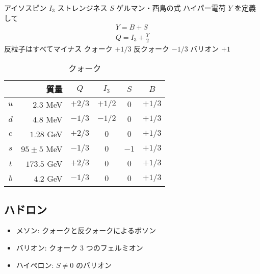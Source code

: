 \documentclass[a4paper,11pt]{jlreq}
\begin{document}
アイソスピン $I_3$
ストレンジネス $S$
ゲルマン・西島の式
ハイパー電荷 $Y$ を定義して
\begin{align}
  Y = B + S \\
  Q = I_3 + \frac{Y}{2}
\end{align}
反粒子はすべてマイナス
クォーク $+1/3$ 反クォーク $-1/3$
バリオン $+1$
\begin{table}[h]
  \centering
  \begin{tabular}{|c|rcccc|}
    \hline
        & 質量                 & $Q$    & $I_3$  & $S$  & $B$    \\
    \hline
    $u$ & $2.3$ \si{MeV}     & $+2/3$ & $+1/2$ & $0$  & $+1/3$ \\
    $d$ & $4.8$ \si{MeV}     & $-1/3$ & $-1/2$ & $0$  & $+1/3$ \\
    $c$ & $1.28$ \si{GeV}    & $+2/3$ & $0$    & $0$  & $+1/3$ \\
    $s$ & $95\pm 5$ \si{MeV} & $-1/3$ & $0$    & $-1$ & $+1/3$ \\
    $t$ & $173.5$ \si{GeV}   & $+2/3$ & $0$    & $0$  & $+1/3$ \\
    $b$ & $4.2$ \si{GeV}     & $-1/3$ & $0$    & $0$  & $+1/3$ \\
    \hline
  \end{tabular}
  \caption{クォーク}
  \label{table:quark}
\end{table}


\subsection{ハドロン}
\begin{itemize}
  \item メソン: クォークと反クォークによるボソン
  \item バリオン: クォーク 3 つのフェルミオン
  \item ハイペロン: $S\neq 0$ のバリオン
\end{itemize}
\end{document}
